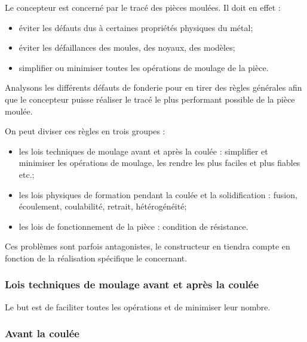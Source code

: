\documentclass[11pt,oneside]{article}
\begin{document}
Le concepteur est concerné par le tracé des pièces moulées. Il doit en effet :
\begin{itemize}
 \item éviter les défauts dus à certaines propriétés physiques du métal;
\item éviter les défaillances des moules, des noyaux, des modèles;
\item simplifier ou minimiser toutes les opérations de moulage de la pièce.
\end{itemize}

Analysons les différents défauts de fonderie pour en tirer des règles générales
afin que le concepteur puisse réaliser le tracé le plus performant possible de
la pièce moulée. 

On peut diviser ces règles en trois groupes : 
\begin{itemize}
 \item les lois techniques de moulage avant et après la coulée : simplifier et
minimiser les opérations de moulage, les rendre les plus faciles et plus
fiables etc.;
\item les lois physiques de formation pendant la coulée et la solidification :
fusion, écoulement, coulabilité, retrait, hétérogénéité;
\item les lois de fonctionnement de la pièce : condition de résistance. 
\end{itemize}

Ces problèmes sont parfois antagonistes, le constructeur en tiendra compte en
fonction de la réalisation spécifique le concernant.

\subsubsection{Lois techniques de moulage avant et après la coulée}


Le but est de faciliter toutes les opérations et de minimiser leur nombre. 

\subsubsection*{Avant la coulée}
\end{document}

